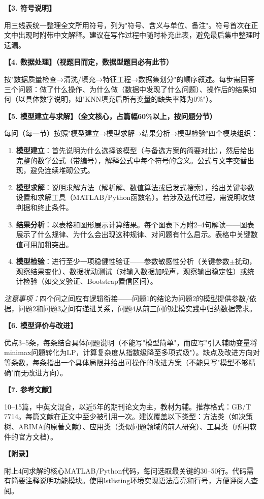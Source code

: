 \documentclass[12pt,a4paper]{ctexart}
\begin{document}
\medskip
\noindent\textbf{【3. 符号说明】}

用三线表统一整理全文所用符号，列为"符号、含义与单位、备注"。符号首次在正文中出现时附带中文解释。建议在写作过程中随时补充此表，避免最后集中整理时遗漏。

\medskip
\noindent\textbf{【4. 数据处理】（视题目而定，数据型题目必有此节）}

按"数据质量检查→清洗/填充→特征工程→数据集划分"的顺序叙述。每步需回答三个问题：做了什么操作、为什么做（数据中发现了什么问题）、操作后的结果如何（以具体数字说明，如"KNN填充后所有变量的缺失率降为0\%"）。

\medskip
\noindent\textbf{【5. 模型建立与求解】（全文核心，占篇幅60\%以上，按问题分节）}

每问（每一节）按照"模型建立→模型求解→结果分析→模型检验"四个模块组织：

\begin{enumerate}[leftmargin=*]
    \item \textbf{模型建立}：首先说明为什么选择该模型（与备选方案的简要对比），然后给出完整的数学公式（带编号），解释公式中每个符号的含义。公式与文字交替出现，避免连续堆砌公式。
    \item \textbf{模型求解}：说明求解方法（解析解、数值算法或启发式搜索），给出关键参数设置和求解工具（MATLAB/Python函数名）。若涉及迭代过程，需说明收敛判据和终止条件。
    \item \textbf{结果分析}：以表格和图形展示计算结果。每个图表下方附2--4句解读——图表展示了什么规律、为什么会出现这种规律、对问题有什么启示。表格中关键数值可用加粗突出。
    \item \textbf{模型检验}：进行至少一项稳健性验证——参数敏感性分析（关键参数$\pm$扰动，观察结果变化）、数据扰动测试（对输入数据加噪声，观察输出稳定性）或统计检验（如交叉验证、Bootstrap置信区间）。
\end{enumerate}

\textit{注意事项：}四个问之间应有逻辑衔接——问题1的结论为问题2的模型提供参数/依据，问题2和问题3之间有递进关系，问题4从前三问的建模实践中归纳数据需求。

\medskip
\noindent\textbf{【6. 模型评价与改进】}

优点3--5条，每条结合具体问题说明（不能写"模型简单"，而应写"引入辅助变量将minimax问题转化为LP，计算复杂度从指数级降至多项式级"）。缺点及改进方向对等条数，每条指出一个具体局限并给出可操作的改进方案（不能只写"模型不够精确"而无改进方向）。

\medskip
\noindent\textbf{【7. 参考文献】}

10--15篇，中英文混合，以近5年的期刊论文为主，教材为辅。推荐格式：GB/T 7714。每篇文献在正文中至少被引用一次。建议覆盖以下类型：方法类（如决策树、ARIMA的原著文献）、应用类（类似问题领域的前人研究）、工具类（所用软件的官方文档）。

\medskip
\noindent\textbf{【附录】}

附上4问求解的核心MATLAB/Python代码，每问选取最关键的30--50行。代码需有简要注释说明功能模块。使用lstlisting环境实现语法高亮和行号，方便评阅人查阅。
\end{document}
